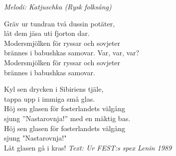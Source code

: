 {\footnotesize\textit{Melodi: Katjuschka (Rysk folksång)}}\par
\vspace{10pt}
\par
Gräv ur tundran två dussin potäter,\\
låt dem jäsa uti fjorton dar.\\
Modersmjölken för ryssar och sovjeter\\
brännes i babushkas samovar. Var, var, var?\\
Modersmjölken för ryssar och sovjeter\\
brännes i babushkas samovar.\par
\vspace{10pt}
Kyl sen drycken i Sibiriens tjäle,\\
tappa upp i immiga små glas.\\
Höj sen glasen för fosterlandets välgång\\
sjung ”Nastarovnja!” med en mäktig bas.\\
Höj sen glasen för fosterlandets välgång\\
sjung "Nastarovnja!" \\
Låt glasen gå i kras!
\vspace{10pt}
{\footnotesize\textit{Text: Ur FEST:s spex Lenin 1989}}

